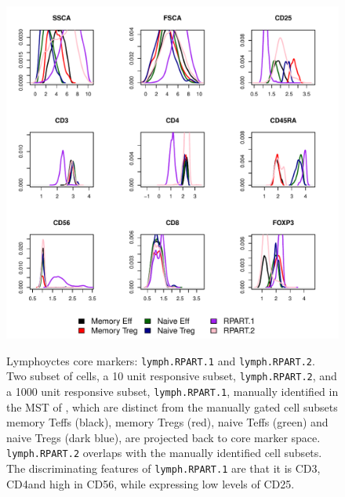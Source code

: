 \begin{figure}
\centering
\begin{minipage}{.8\textwidth}
\includegraphics[width=\linewidth]{figures/rpart-lymphocytes-clusters}
\end{minipage}
{  Lymphoyctes core markers: \texttt{lymph.RPART.1} and \texttt{lymph.RPART.2}.  }
{
    Two subset of cells, a 10 unit responsive subset, \texttt{lymph.RPART.2}, and a 1000 unit responsive subset, \texttt{lymph.RPART.1}, manually identified in the MST of , which are distinct from the manually gated cell subsets memory Teffs (black), memory Tregs (red), naive Teffs (green) and naive Tregs (dark blue), are projected back to core marker space.
    \texttt{lymph.RPART.2} overlaps with the manually identified cell subsets.
    The discriminating features of \texttt{lymph.RPART.1} are that it is CD3\negative, CD4\negative and high in CD56, while expressing low levels of CD25.
}
\end{figure}
